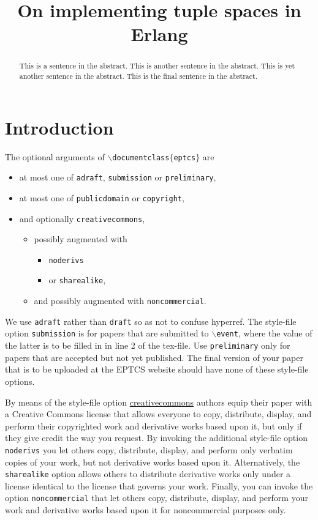 \documentclass[submission,copyright,creativecommons]{eptcs}
\title{On implementing tuple spaces in Erlang}
\begin{document}
\maketitle

\begin{abstract}
This is a sentence in the abstract.
This is another sentence in the abstract.
This is yet another sentence in the abstract.
This is the final sentence in the abstract.
\end{abstract}

\section{Introduction}

The optional arguments of {\tt $\backslash$documentclass$\{$eptcs$\}$} are
\begin{itemize}
\item at most one of
{\tt adraft},
{\tt submission} or
{\tt preliminary},
\item at most one of {\tt publicdomain} or {\tt copyright},
\item and optionally {\tt creativecommons},
  \begin{itemize}
  \item possibly augmented with
    \begin{itemize}
    \item {\tt noderivs}
    \item or {\tt sharealike},
    \end{itemize}
  \item and possibly augmented with {\tt noncommercial}.
  \end{itemize}
\end{itemize}
We use {\tt adraft} rather than {\tt draft} so as not to confuse hyperref.
The style-file option {\tt submission} is for papers that are
submitted to {\tt $\backslash$event}, where the value of the latter is
to be filled in in line 2 of the tex-file. Use {\tt preliminary} only
for papers that are accepted but not yet published. The final version
of your paper that is to be uploaded at the EPTCS website should have
none of these style-file options.

By means of the style-file option
\href{http://creativecommons.org/licenses/}{creativecommons}
authors equip their paper with a Creative Commons license that allows
everyone to copy, distribute, display, and perform their copyrighted
work and derivative works based upon it, but only if they give credit
the way you request. By invoking the additional style-file option {\tt
noderivs} you let others copy, distribute, display, and perform only
verbatim copies of your work, but not derivative works based upon
it. Alternatively, the {\tt sharealike} option allows others to
distribute derivative works only under a license identical to the
license that governs your work. Finally, you can invoke the option
{\tt noncommercial} that let others copy, distribute, display, and
perform your work and derivative works based upon it for
noncommercial purposes only.
\end{document}
